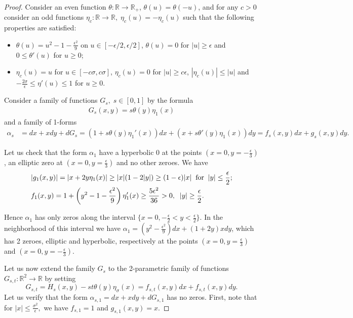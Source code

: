 \documentclass[12pt]{amsart}
\theoremstyle{plain}
\theoremstyle{definition}
\theoremstyle{remark}
\newcommand{\R}{\mathbb{R}}
\newcommand{\eps}{\epsilon}
\begin{document}
 \begin{proof}   
 Consider  an even    function  $\theta :\R \to\R_+$, 
 $\theta(u)=\theta(-u)$, and for any $c>0$ consider an odd  functions $\eta_c:\R\to\R, \; \eta_c(u)=-\eta_c(u)$
 such that   the following properties are satisfied:
 
 \begin{itemize}
 \item[-]$\theta(u)= u^2-1-\frac{\eps^2}9$   on $u\in[-\eps/2,\eps/2]$,  $\theta (u)=0$ for $ |u|\geq \eps$  and $0\leq\theta'(u)$ for $u\geq 0$;
 \item[-] $\eta_c(u)=u$  for  $u\in[-c\sigma, c\sigma]$, $\eta_c(u)=0$  for $ |u|\geq c\eps$, $|\eta_c(u)|\leq |u|$ and $- \frac{2\sigma}\eps\leq    \eta'(u)\leq 1$ for $u\geq 0$.
 \end{itemize}
Consider  a family of functions $G_{s}, \; s\in[0,1]$ by the formula
 \begin{align*}G_{s }(x,y)= s \theta(y )\eta_1 (x ) \end{align*}
  and a family of 1-forms
  \begin{align*} \alpha_s&=dx+xdy+dG_s= (1+ s \theta ( y )\eta_1' (x) )dx 
   + (x+s\theta'(y)\eta_1(x)) dy =f_s(x,y)dx+g_s(x,y)dy.
  \end{align*}

  Let us check  that the form $\alpha_1$ have a hyperbolic $0$ at the points $(x=0, y=-\frac\eps 3)$, an elliptic zero at $(x=0, y=\frac\eps 3)$ and no other zeroes.
  We have    \begin{equation}
 \label{eq:1-param}\begin{split}
  & |g_1(x,y)|=|x+2y\eta_1(x)|\geq|x|(1-2|y|)\geq(1- \eps )|x|\;\;\hbox{for}\;\; |y|\leq\frac\eps 2 ;\\
  &f_1(x,y)=1+  \left(y^2-1-\frac{\eps^2}9\right)\eta_1' (x) \geq  \frac{5\eps^2}{36}>0,\;\;  |y|\geq\frac\eps 2.
  \end{split}
  \end{equation}
  
   Hence $\alpha_1$ has only zeros along the interval $\{x=0, -\frac\eps2<y<\frac\eps2\}$. In the neighborhood of this interval 
we have $\alpha_1=(y^2 -\frac{\eps^2}9)dx+ (1+2y)x dy$, which has 2 zeroes, elliptic and hyperbolic, respectively  at the points  $(x=0, y=\frac\eps 3)$ and   $(x=0, y=-\frac\eps 3)$.

Let us now extend the family $G_s$ to the 2-parametric family of functions
$G_{s,t}:\R^2\to\R$ by setting
$$G_{s,t}=H_s(x,y)-st\theta(y)\eta_\sigma(x)=f_{s,t}(x,y)dx+f_{s,t}(x,y)dy.$$
Let us verify that the form
$\alpha_{s,1}=dx+xdy+ dG_{s,1}$ has no zeros.
First, note that for $|x|\leq \frac{\sigma^2}\eps,$ we have
$f_{s,1}=1$ and 
$g_{s,1}(x,y)=x$.


\end{proof}
\end{document}
